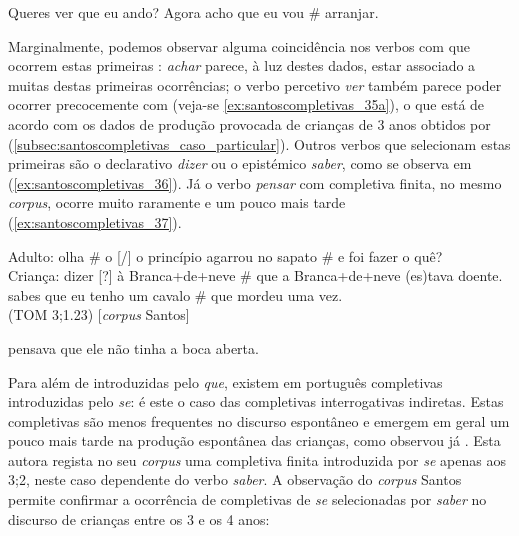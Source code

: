 \documentclass[output=paper]{LSP/langsci}
\begin{document}
\ea\label{ex:santoscompletivas_35}
\ea\label{ex:santoscompletivas_35a} Queres ver que eu ando? 
\ex\label{ex:santoscompletivas_35b} Agora acho que eu vou \# arranjar.
\zl

Marginalmente, podemos observar alguma coincidência nos verbos com que ocorrem estas primeiras : \textit{achar} parece, à luz destes dados, estar associado a muitas destas primeiras ocorrências; o verbo percetivo \textit{ver} também parece poder ocorrer precocemente com  (veja-se \ref{ex:santoscompletivas_35a}), o que está de acordo com os dados de produção provocada de crianças de 3 anos obtidos por \citet{santos_etal2016} (\ref{subsec:santoscompletivas_caso_particular}). Outros verbos que selecionam estas primeiras  são o declarativo \textit{dizer} ou o epistémico \textit{saber}, como se observa em (\ref{ex:santoscompletivas_36}). Já o verbo \textit{pensar} com completiva finita, no mesmo \textit{corpus}, ocorre muito raramente e um pouco mais tarde (\ref{ex:santoscompletivas_37}).

\ea\label{ex:santoscompletivas_36}
\ea\label{ex:santoscompletivas_36a} Adulto: olha \# o [/] o princípio agarrou no sapato \# e foi fazer o quê?\\
Criança: dizer [?] à Branca+de+neve \# que a Branca+de+neve (es)tava doente.
\ex\label{ex:santoscompletivas_36b} sabes que eu tenho um cavalo \# que mordeu uma vez.\\(TOM 3;1.23) [\textit{corpus} Santos]
\zl

\ea\label{ex:santoscompletivas_37} pensava que ele não tinha a boca aberta.
\z

Para além de  introduzidas pelo  \textit{que}, existem em português completivas introduzidas pelo  \textit{se}: é este o caso das completivas interrogativas indiretas. Estas completivas são menos frequentes no discurso espontâneo e emergem em geral um pouco mais tarde na produção espontânea das crianças, como observou já \citet{soares2006}. Esta autora regista no seu \textit{corpus} uma completiva finita introduzida por \textit{se} apenas aos 3;2, neste caso dependente do verbo \textit{saber}. A observação do \textit{corpus} Santos permite confirmar a ocorrência de completivas de \textit{se} selecionadas por \textit{saber} no discurso de crianças entre os 3 e os 4 anos:\largerpage
\end{document}
